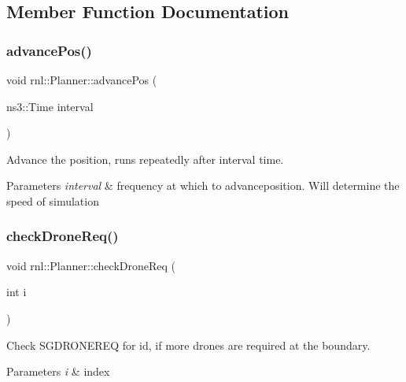\subsection{Member Function Documentation}
\mbox{\label{classrnl_1_1Planner_ac3647c6d576412e08dbb9006b7f796ec}} 
\subsubsection{\texorpdfstring{advance\+Pos()}{advancePos()}}
{\footnotesize\ttfamily void rnl\+::\+Planner\+::advance\+Pos (\begin{DoxyParamCaption}\item[{ns3\+::\+Time}]{interval }\end{DoxyParamCaption})}



Advance the position, runs repeatedly after interval time. 


\begin{DoxyParams}{Parameters}
{\em interval} & frequency at which to advanceposition. Will determine the speed of simulation \\
\hline
\end{DoxyParams}
\mbox{\label{classrnl_1_1Planner_a39264641415dc64fe44ab2c8266128fc}} 
\subsubsection{\texorpdfstring{check\+Drone\+Req()}{checkDroneReq()}}
{\footnotesize\ttfamily void rnl\+::\+Planner\+::check\+Drone\+Req (\begin{DoxyParamCaption}\item[{int}]{i }\end{DoxyParamCaption})}



Check S\+G\+D\+R\+O\+N\+E\+R\+EQ for id, if more drones are required at the boundary. 


\begin{DoxyParams}{Parameters}
{\em i} & index \\
\hline
\end{DoxyParams}
\mbox{\label{classrnl_1_1Planner_a023f298c358c86118a3c66e5f62c6121}} 
